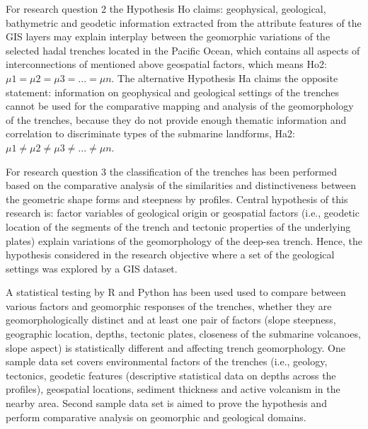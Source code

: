 \documentclass[11pt,a4paper]{report}
\begin{document}
For research question 2 the Hypothesis Ho claims: geophysical, geological, bathymetric and geodetic information extracted from the attribute features of the GIS layers may explain interplay between the geomorphic variations of the selected hadal trenches located in the Pacific Ocean, which contains all aspects of interconnections of mentioned above geospatial factors, which means Ho2: $\mu1= \mu2 = \mu3 = ... = \mu n$.
The alternative Hypothesis Ha claims the opposite statement: information on geophysical and geological settings of the trenches cannot be used for the comparative mapping and analysis of the geomorphology of the trenches, because they do not provide enough thematic information and correlation to discriminate types of the submarine landforms, Ha2: $\mu1\neq \mu2 \neq \mu3 \neq ... \neq \mu n$. 

For research question 3 the classification of the trenches has been performed based on the comparative analysis of the similarities and distinctiveness between the geometric shape forms and steepness by profiles. Central hypothesis of this research is: factor variables of geological origin or geospatial factors (i.e., geodetic location of the segments of the trench and tectonic properties of the underlying plates) explain variations of the geomorphology of the deep-sea trench. Hence, the hypothesis considered in the research objective where a set of the geological settings was explored by a \ac{GIS} dataset. 

A statistical testing by R and Python has been used used to compare between various factors and geomorphic responses of the trenches, whether they are geomorphologically distinct and at least one pair of factors (slope steepness, geographic location, depths, tectonic plates, closeness of the submarine volcanoes, slope aspect) is statistically different and affecting trench geomorphology. One sample data set covers environmental factors of the trenches (i.e., geology, tectonics, geodetic features (descriptive statistical data on depths across the profiles), geospatial locations, sediment thickness \cite{Lemenkova202008} and active volcanism in the nearby area. Second sample data set is aimed to prove the hypothesis and perform comparative analysis on geomorphic and geological domains. 
\end{document}
